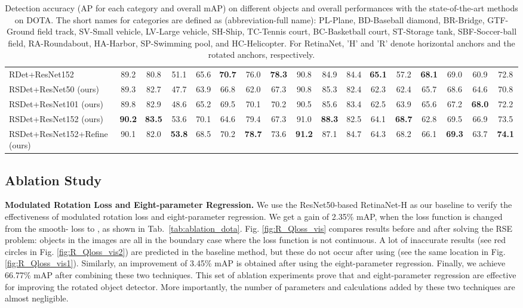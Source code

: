 \documentclass[10pt,twocolumn,letterpaper]{article}
\newlength\savewidth
\newcommand\rhline{\noalign{\global\savewidth\arrayrulewidth
                           \global\arrayrulewidth 0.4pt}\hline
                  \noalign{\global\arrayrulewidth\savewidth}}
\begin{document}
\begin{table*}[h]
{\begin{tabular}{l|ccccccccccccccc|c}
        RDet+ResNet152 \cite{R20_Yang2019R3Det} & 89.2 & 80.8 & 51.1 & 65.6 & \textbf{70.7} & 76.0 & \textbf{78.3} & 90.8 & 84.9 & 84.4 & \textbf{65.1} & 57.2 & \textbf{68.1} & 69.0 & 60.9 & 72.8\\
        \rhline
        RSDet+ResNet50 (ours) & 89.3 & 82.7 & 47.7 & 63.9 & 66.8 & 62.0 & 67.3 & 90.8 & 85.3 & 82.4 & 62.3 & 62.4 & 65.7 & 68.6 & 64.6 & 70.8\\
        RSDet+ResNet101 (ours) & 89.8 & 82.9 & 48.6 & 65.2 & 69.5 & 70.1 & 70.2 & 90.5 & 85.6 & 83.4 & 62.5 & 63.9 & 65.6 & 67.2 & \textbf{68.0} & 72.2\\
        RSDet+ResNet152 (ours) & \textbf{90.2} & \textbf{83.5} & 53.6 & 70.1 & 64.6 & 79.4 & 67.3 & 91.0 & \textbf{88.3} & 82.5 & 64.1 & \textbf{68.7} & 62.8 & 69.5 & 66.9 & 73.5\\
        RSDet+ResNet152+Refine
        (ours) & 90.1 & 82.0 & \textbf{53.8} & 68.5 & 70.2 & \textbf{78.7} & 73.6 & \textbf{91.2} & 87.1 & 84.7 & 64.3 & 68.2 & 66.1 & \textbf{69.3} & 63.7 & \textbf{74.1}\\
    \end{tabular}}
    \caption{Detection accuracy (AP for each category and overall mAP) on different objects and overall performances with the state-of-the-art methods on DOTA. The short names for categories are defined as (abbreviation-full name): PL-Plane, BD-Baseball diamond, BR-Bridge, GTF-Ground field track, SV-Small vehicle, LV-Large vehicle, SH-Ship, TC-Tennis court, BC-Basketball court, ST-Storage tank, SBF-Soccer-ball field, RA-Roundabout, HA-Harbor, SP-Swimming pool, and HC-Helicopter. For RetinaNet, 'H' and 'R' denote horizontal anchors and the rotated anchors, respectively.}
    \label{tab:dota_sota}
    \vspace{-8pt}
\end{table*}

\subsection{Ablation Study}
\textbf{Modulated Rotation Loss and Eight-parameter Regression.}
We use the ResNet50-based RetinaNet-H as our baseline to verify the effectiveness of modulated rotation loss  and eight-parameter regression. We get a gain of 2.35\% mAP, when the loss function is changed from the smooth- loss to , as shown in Tab.~\ref{tab:ablation_dota}. Fig. \ref{fig:R_Qloss_vis} compares results before and after solving the RSE problem: objects in the images are all in the boundary case where the loss function is not continuous. A lot of inaccurate results (see red circles in Fig. \ref{fig:R_Qloss_vis2}) are predicted in the baseline method, but these do not occur after using  (see the same location in Fig. \ref{fig:R_Qloss_vis1}). Similarly, an improvement of 3.45\% mAP is obtained after using the eight-parameter regression. Finally, we achieve 66.77\% mAP after combining these two techniques. This set of ablation experiments prove that  and eight-parameter regression are effective for improving the rotated object detector. More importantly, the number of parameters and calculations added by these two techniques are almost negligible.
\end{document}
